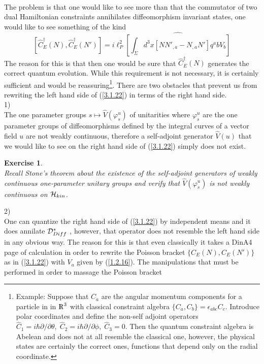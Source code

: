 \documentclass[12pt]{report}
\newtheorem{Exercise}{Exercise}[section]
\def\be{\begin{equation}}
\def\ee{\end{equation}}
\def\Rl{{\mathchoice
{\setbox0=\hbox{$\displaystyle\rm R$}\hbox{\hbox to0pt
{\kern0.4\wd0\vrule height0.9\ht0\hss}\box0}}
{\setbox0=\hbox{$\textstyle\rm R$}\hbox{\hbox to0pt
{\kern0.4\wd0\vrule height0.9\ht0\hss}\box0}}
{\setbox0=\hbox{$\scriptstyle\rm R$}\hbox{\hbox to0pt
{\kern0.4\wd0\vrule height0.9\ht0\hss}\box0}}
{\setbox0=\hbox{$\scriptscriptstyle\rm R$}\hbox{\hbox to0pt
{\kern0.4\wd0\vrule height0.9\ht0\hss}\box0}}}}
\begin{document}
\\
The 
problem is that one would like to see more than that the commutator of two
dual Hamiltonian constraints annihilates diffeomorphism invariant states,
one would like to see something of the kind
\be \label{3.1.22}
[\hat{C}^\dagger_E(N),\hat{C}^\dagger_E(N')]
=i\ell_P^2\widehat{[\int_\Sigma d^3x [N N'_{,a}-N_{,a} N'] q^ab V_b]}
\ee
The reason for this is that then one would be sure that 
$\hat{C}^\dagger_E(N)$ generates the correct quantum evolution.
While this requirement is not necessary, it is certainly sufficient and 
would be reassuring\footnote{Example: Suppose that $C_a$ are the angular 
momentum
components for a particle in in $\Rl^3$ with classical constraint algebra 
$\{C_a,C_b\}=\epsilon_{abc} C_c$. Introduce polar coordinates and 
define the non-self adjoint operators
$\hat{C}_1=i\hbar\partial/\partial\theta,\;
\hat{C}_2=i\hbar\partial/\partial\phi,\;\hat{C}_3=0$. Then the quantum 
constraint
algebra is Abelean and does not at all resemble the classical one, however,
the physical states are certainly the correct ones, functions that depend 
only on the radial coordinate.}. There are two obstacles that 
prevent us from rewriting the left hand side of (\ref{3.1.22}) in terms 
of the right hand side.\\
1)\\
The one parameter groups $s\mapsto \hat{V}(\varphi^u_s)$ of unitarities
where $\varphi_s^u$ are the one parameter groups of diffeomorphisms 
defined by the integral curves of a vector field $u$ are not weakly 
continuous, therefore a self-adjoint generator $\hat{V}(u)$ that we would
like to see on the right hand side of (\ref{3.1.22}) simply does not exist.
%
\begin{Exercise} \label{ex3.1.7}  ~~~~~~\\
Recall Stone's theorem about the existence of the self-adjoint generators
of weakly continuous one-parameter unitary groups and verify that 
$\hat{V}(\varphi^u_s)$ is not weakly continuous on ${\cal H}_{kin}$.
\end{Exercise}
%
2)\\
One can quantize the right hand side of (\ref{3.1.22}) by independent means
and it does annilate ${\cal D}^\ast_{Diff}$ \cite{41}, however, that 
operator does not resemble the left hand side in any obvious way. 
The reason for this is that even classically it takes a DinA4 page 
of calculation in order to rewrite the Poisson bracket $\{C_E(N),C_E(N')\}$
as in (\ref{3.1.22}) with $V_a$ given by (\ref{1.2.16}). The 
manipulations that must be performed in order to massage the Poisson bracket
\end{document}
